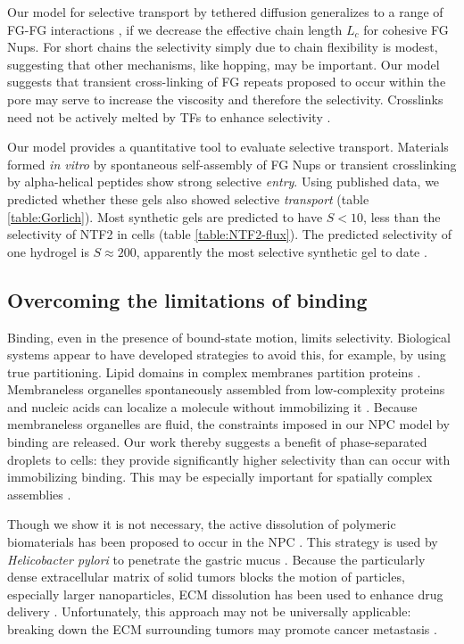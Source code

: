 Our model for selective transport by tethered diffusion generalizes to
a range of FG-FG interactions \cite{vovk16}, if we decrease the
effective chain length $L_c$ for cohesive FG Nups.  For short chains
the selectivity simply due to chain flexibility is modest, suggesting
that other mechanisms, like hopping, may be important.  Our model
suggests that transient cross-linking of FG repeats proposed to occur
within the pore may serve to increase the viscosity and therefore the
selectivity. Crosslinks need not be actively melted by TFs to enhance
selectivity .
  
Our model provides a quantitative tool to evaluate selective
transport. Materials formed \textit{in vitro} by spontaneous
self-assembly of FG Nups \cite{frey07} or transient crosslinking by
alpha-helical peptides \cite{kim15} show strong selective
\textit{entry}.  Using published data, we predicted whether these gels
also showed selective \textit{transport} (table \ref{table:Gorlich}).
Most synthetic gels are predicted to have $S<10$, less than the
selectivity of NTF2 in cells (table \ref{table:NTF2-flux}). The
predicted selectivity of one hydrogel is $S\approx200$, apparently the
most selective synthetic gel to date \cite{frey07}.


\subsection*{Overcoming the limitations of binding}
Binding, even in the presence of bound-state motion, limits
selectivity.  Biological systems appear to have developed strategies
to avoid this, for example, by using true partitioning.  Lipid domains
in complex membranes partition proteins \cite{simons11}.  Membraneless
organelles spontaneously assembled from low-complexity proteins and
nucleic acids can localize a molecule without immobilizing it
\cite{brangwynne15}.  Because membraneless organelles are fluid, the
constraints imposed in our NPC model by binding are released.  Our
work thereby suggests a benefit of phase-separated droplets to cells:
they provide significantly higher selectivity than can occur with
immobilizing binding. This may be especially important for spatially
complex assemblies \cite{feric16}.

Though we show it is not necessary, the active dissolution of
polymeric biomaterials has been proposed to occur in the NPC
\cite{ribbeck01}. This strategy is used by \textit{Helicobacter
  pylori} to penetrate the gastric mucus \cite{celli09}. Because the
particularly dense extracellular matrix of solid tumors blocks the
motion of particles, especially larger nanoparticles, ECM dissolution
has been used to enhance drug delivery \cite{zhou13}. Unfortunately,
this approach may not be universally applicable: breaking down the ECM
surrounding tumors may promote cancer metastasis \cite{miao15}.


